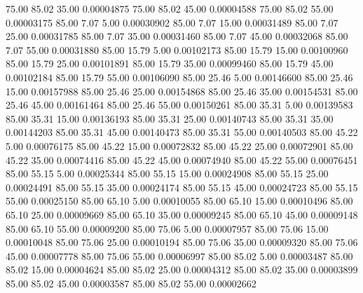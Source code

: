      75.00     85.02     35.00     0.00004875
     75.00     85.02     45.00     0.00004588
     75.00     85.02     55.00     0.00003175
     85.00      7.07      5.00     0.00030902
     85.00      7.07     15.00     0.00031489
     85.00      7.07     25.00     0.00031785
     85.00      7.07     35.00     0.00031460
     85.00      7.07     45.00     0.00032068
     85.00      7.07     55.00     0.00031880
     85.00     15.79      5.00     0.00102173
     85.00     15.79     15.00     0.00100960
     85.00     15.79     25.00     0.00101891
     85.00     15.79     35.00     0.00099460
     85.00     15.79     45.00     0.00102184
     85.00     15.79     55.00     0.00106090
     85.00     25.46      5.00     0.00146600
     85.00     25.46     15.00     0.00157988
     85.00     25.46     25.00     0.00154868
     85.00     25.46     35.00     0.00154531
     85.00     25.46     45.00     0.00161464
     85.00     25.46     55.00     0.00150261
     85.00     35.31      5.00     0.00139583
     85.00     35.31     15.00     0.00136193
     85.00     35.31     25.00     0.00140743
     85.00     35.31     35.00     0.00144203
     85.00     35.31     45.00     0.00140473
     85.00     35.31     55.00     0.00140503
     85.00     45.22      5.00     0.00076175
     85.00     45.22     15.00     0.00072832
     85.00     45.22     25.00     0.00072901
     85.00     45.22     35.00     0.00074416
     85.00     45.22     45.00     0.00074940
     85.00     45.22     55.00     0.00076451
     85.00     55.15      5.00     0.00025344
     85.00     55.15     15.00     0.00024908
     85.00     55.15     25.00     0.00024491
     85.00     55.15     35.00     0.00024174
     85.00     55.15     45.00     0.00024723
     85.00     55.15     55.00     0.00025150
     85.00     65.10      5.00     0.00010055
     85.00     65.10     15.00     0.00010496
     85.00     65.10     25.00     0.00009669
     85.00     65.10     35.00     0.00009245
     85.00     65.10     45.00     0.00009148
     85.00     65.10     55.00     0.00009200
     85.00     75.06      5.00     0.00007957
     85.00     75.06     15.00     0.00010048
     85.00     75.06     25.00     0.00010194
     85.00     75.06     35.00     0.00009320
     85.00     75.06     45.00     0.00007778
     85.00     75.06     55.00     0.00006997
     85.00     85.02      5.00     0.00003487
     85.00     85.02     15.00     0.00004624
     85.00     85.02     25.00     0.00004312
     85.00     85.02     35.00     0.00003899
     85.00     85.02     45.00     0.00003587
     85.00     85.02     55.00     0.00002662
